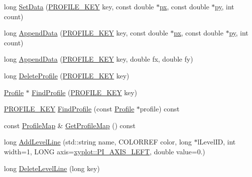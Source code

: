 \begin{DoxyCompactItemize}
\item 
long \hyperlink{class_x_y_plot_a82c143a9a555f8f5ce21ae053761d435}{Set\-Data} (\hyperlink{profile_8h_ab564cd67657a739c9e5a6caa0ce0dafa}{P\-R\-O\-F\-I\-L\-E\-\_\-\-K\-E\-Y} key, const double $\ast$\hyperlink{namespacexyplot_aa88522a2f4371e38891cac7b5bc3e4aa}{px}, const double $\ast$\hyperlink{namespacexyplot_adc56454d6bac520db8907c6a206d3040}{py}, int count)
\item 
long \hyperlink{class_x_y_plot_af9f511708fb6fe4240545fa8bee7219e}{Append\-Data} (\hyperlink{profile_8h_ab564cd67657a739c9e5a6caa0ce0dafa}{P\-R\-O\-F\-I\-L\-E\-\_\-\-K\-E\-Y} key, const double $\ast$\hyperlink{namespacexyplot_aa88522a2f4371e38891cac7b5bc3e4aa}{px}, const double $\ast$\hyperlink{namespacexyplot_adc56454d6bac520db8907c6a206d3040}{py}, int count)
\item 
long \hyperlink{class_x_y_plot_a754ac9a97d3e66f69a83e6a971e8242e}{Append\-Data} (\hyperlink{profile_8h_ab564cd67657a739c9e5a6caa0ce0dafa}{P\-R\-O\-F\-I\-L\-E\-\_\-\-K\-E\-Y} key, double fx, double fy)
\item 
long \hyperlink{class_x_y_plot_a24a44164201dfc5184f349806430498c}{Delete\-Profile} (\hyperlink{profile_8h_ab564cd67657a739c9e5a6caa0ce0dafa}{P\-R\-O\-F\-I\-L\-E\-\_\-\-K\-E\-Y} key)
\item 
\hyperlink{class_profile}{Profile} $\ast$ \hyperlink{class_x_y_plot_a6bb23b5bc86447514974062ad7837397}{Find\-Profile} (\hyperlink{profile_8h_ab564cd67657a739c9e5a6caa0ce0dafa}{P\-R\-O\-F\-I\-L\-E\-\_\-\-K\-E\-Y} key)
\item 
\hyperlink{profile_8h_ab564cd67657a739c9e5a6caa0ce0dafa}{P\-R\-O\-F\-I\-L\-E\-\_\-\-K\-E\-Y} \hyperlink{class_x_y_plot_a88b66247e3eb82862bee86382a08c4d4}{Find\-Profile} (const \hyperlink{class_profile}{Profile} $\ast$profile) const 
\item 
const \hyperlink{profile_8h_a19285e49c540d09517740fab4252f854}{Profile\-Map} \& \hyperlink{class_x_y_plot_a863a2c3f0cee88348d4df1cb5a703073}{Get\-Profile\-Map} () const 
\item 
long \hyperlink{class_x_y_plot_af7405f7798a2c5b25a0265e3603de426}{Add\-Level\-Line} (std\-::string name, C\-O\-L\-O\-R\-R\-E\-F color, long $\ast$l\-Level\-I\-D, int width=1, L\-O\-N\-G axis=\hyperlink{namespacexyplot_aab624afb50724c293bffe01fff26c9c2a5cab3df16a4e44f280dec6a0108dc09d}{xyplot\-::\-P\-I\-\_\-\-A\-X\-I\-S\-\_\-\-L\-E\-F\-T}, double value=0.)
\item 
long \hyperlink{class_x_y_plot_acd6083749072d99ac5f9f2fdd6a7db15}{Delete\-Level\-Line} (long key)

\end{DoxyCompactItemize}
